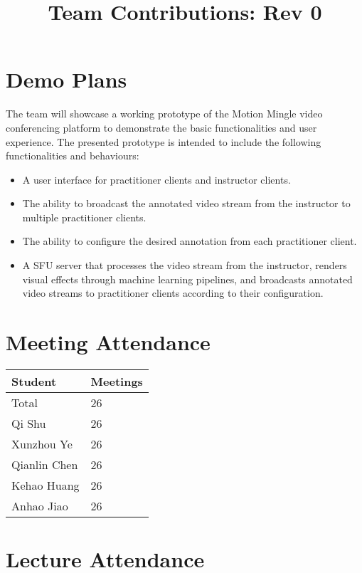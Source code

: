 \documentclass{article}
\title{Team Contributions: Rev 0\\\progname}
\author{\authname}
\date{}
\begin{document}
\maketitle

\section{Demo Plans}

The team will showcase a working prototype of the Motion Mingle video
conferencing platform to demonstrate the basic functionalities and user
experience. The presented prototype is intended to include the following
functionalities and behaviours:
\begin{itemize}
\item A user interface for practitioner clients and instructor clients.
\item The ability to broadcast the annotated video stream from the instructor to
  multiple practitioner clients.
\item The ability to configure the desired annotation from each practitioner
  client.
\item A SFU server that processes the video stream from the instructor, renders
  visual effects through machine learning pipelines, and broadcasts annotated
  video streams to practitioner clients according to their configuration.
\end{itemize}

\section{Meeting Attendance}

\begin{table}[H]
  \centering
  \begin{tabular}{ll}
    \toprule
    \textbf{Student}   & \textbf{Meetings} \\
    \midrule
    Total        & 26          \\
    Qi Shu       & 26          \\
    Xunzhou Ye   & 26          \\
    Qianlin Chen & 26          \\
    Kehao Huang  & 26          \\
    Anhao Jiao   & 26          \\
    \bottomrule
  \end{tabular}
\end{table}

\section{Lecture Attendance}
\end{document}
